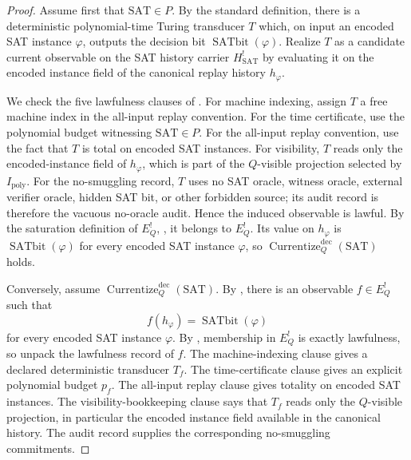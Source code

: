 \documentclass[11pt]{article}
\newcommand{\Hsat}{H^{!}_{\mathrm{SAT}}}
\newcommand{\Ipoly}{I_{\mathrm{poly}}}
\newcommand{\EQbang}{E^{!}_{Q}}
\newcommand{\SATbit}{\operatorname{SATbit}}
\newcommand{\CurrentizeDec}{\operatorname{Currentize}^{\mathrm{dec}}_{Q}}
\theoremstyle{definition}
\begin{document}
\begin{proof}
Assume first that \(\mathrm{SAT}\in P\).  By the standard definition,
there is a deterministic polynomial-time Turing transducer \(T\) which,
on input an encoded SAT instance \(\varphi\), outputs the decision bit
\(\SATbit(\varphi)\).  Realize \(T\) as a candidate current observable
on the SAT history carrier \(\Hsat\) by evaluating it on the encoded
instance field of the canonical replay history \(h_\varphi\).

We check the five lawfulness clauses of
.  For machine indexing, assign
\(T\) a free machine index in the all-input replay convention.  For
the time certificate, use the polynomial budget witnessing
\(\mathrm{SAT}\in P\).  For the all-input replay convention, use the
fact that \(T\) is total on encoded SAT instances.  For visibility,
\(T\) reads only the encoded-instance field of \(h_\varphi\), which is
part of the \(Q\)-visible projection selected by \(\Ipoly\).  For the
no-smuggling record, \(T\) uses no SAT oracle, witness oracle, external
verifier oracle, hidden SAT bit, or other forbidden source; its audit
record is therefore the vacuous no-oracle audit.  Hence the induced
observable is lawful.  By the saturation definition of \(\EQbang\),
, it belongs to \(\EQbang\).  Its value
on \(h_\varphi\) is \(\SATbit(\varphi)\) for every encoded SAT
instance \(\varphi\), so \(\CurrentizeDec(\mathrm{SAT})\) holds.

Conversely, assume \(\CurrentizeDec(\mathrm{SAT})\).  By
, there is an observable
\(f\in\EQbang\) such that
\[
  f(h_{\varphi})=\SATbit(\varphi)
\]
for every encoded SAT instance \(\varphi\).  By
, membership in \(\EQbang\) is exactly
lawfulness, so unpack the lawfulness record of \(f\).  The
machine-indexing clause gives a declared deterministic transducer
\(T_f\).  The time-certificate clause gives an explicit polynomial
budget \(p_f\).  The all-input replay clause gives totality on encoded
SAT instances.  The visibility-bookkeeping clause says that \(T_f\)
reads only the \(Q\)-visible projection, in particular the encoded
instance field available in the canonical history.  The audit record
supplies the corresponding no-smuggling commitments.


\end{proof}
\end{document}
